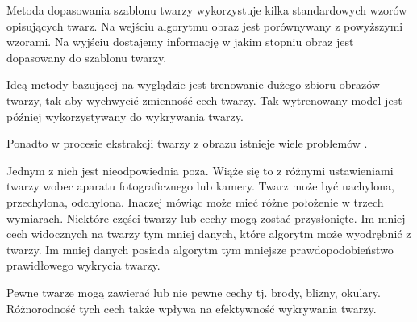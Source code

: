 \documentclass[a4paper,twoside,12pt]{book}
\begin{document}
    Metoda dopasowania szablonu twarzy wykorzystuje kilka standardowych wzorów opisujących twarz.
    Na wejściu algorytmu obraz jest porównywany z powyższymi wzorami.
    Na wyjściu dostajemy informację w jakim stopniu obraz jest dopasowany do szablonu twarzy.

    Ideą metody bazującej na wyglądzie jest trenowanie dużego zbioru obrazów twarzy, tak aby wychwycić zmienność cech
    twarzy.
    Tak wytrenowany model jest później wykorzystywany do wykrywania twarzy.


    Ponadto w procesie ekstrakcji twarzy z obrazu istnieje wiele problemów  \cite{mehdiRizvi}.

    Jednym z nich jest nieodpowiednia poza.
    Wiąże się to z różnymi ustawieniami twarzy wobec aparatu fotograficznego lub kamery.
    Twarz może być nachylona, przechylona, odchylona.
    Inaczej mówiąc może mieć różne położenie w trzech wymiarach.
    Niektóre części twarzy lub cechy mogą zostać przysłonięte.
    Im mniej cech widocznych na twarzy tym mniej danych, które algorytm może wyodrębnić z twarzy.
    Im mniej danych posiada algorytm tym mniejsze prawdopodobieństwo prawidłowego wykrycia twarzy.

    Pewne twarze mogą zawierać lub nie pewne cechy tj. brody, blizny, okulary.
    Różnorodność tych cech także wpływa na efektywność wykrywania twarzy.
\end{document}
